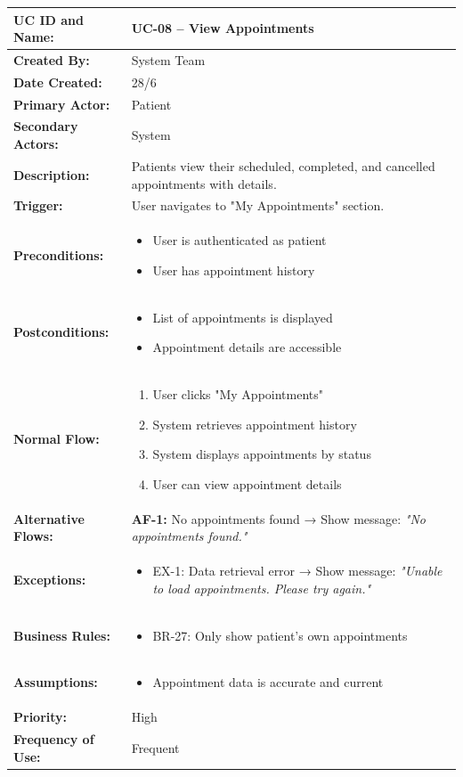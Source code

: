 \documentclass[12pt,a4paper]{article}
\begin{document}
\renewcommand{\arraystretch}{1.5}
\begin{longtable}{|p{4.5cm}|p{10.5cm}|}
\hline
\textbf{UC ID and Name:} & UC-08 – View Appointments \\
\hline
\textbf{Created By:} & System Team \\
\hline
\textbf{Date Created:} & 28/6 \\
\hline
\textbf{Primary Actor:} & Patient \\
\hline
\textbf{Secondary Actors:} & System \\
\hline
\textbf{Description:} & Patients view their scheduled, completed, and cancelled appointments with details. \\
\hline
\textbf{Trigger:} & User navigates to "My Appointments" section. \\
\hline
\textbf{Preconditions:} &
\begin{itemize}
  \item User is authenticated as patient
  \item User has appointment history
\end{itemize} \\
\hline
\textbf{Postconditions:} &
\begin{itemize}
  \item List of appointments is displayed
  \item Appointment details are accessible
\end{itemize} \\
\hline
\textbf{Normal Flow:} &
\begin{enumerate}
  \item User clicks "My Appointments"
  \item System retrieves appointment history
  \item System displays appointments by status
  \item User can view appointment details
\end{enumerate} \\
\hline
\textbf{Alternative Flows:} &
\textbf{AF-1:} No appointments found → Show message: \textit{"No appointments found."} \\
\hline
\textbf{Exceptions:} &
\begin{itemize}
  \item EX-1: Data retrieval error → Show message: \textit{"Unable to load appointments. Please try again."}
\end{itemize} \\
\hline
\textbf{Business Rules:} &
\begin{itemize}
  \item BR-27: Only show patient's own appointments
\end{itemize} \\
\hline
\textbf{Assumptions:} &
\begin{itemize}
  \item Appointment data is accurate and current
\end{itemize} \\
\hline
\textbf{Priority:} & High \\
\hline
\textbf{Frequency of Use:} & Frequent \\
\hline
\end{longtable}
\end{document}
